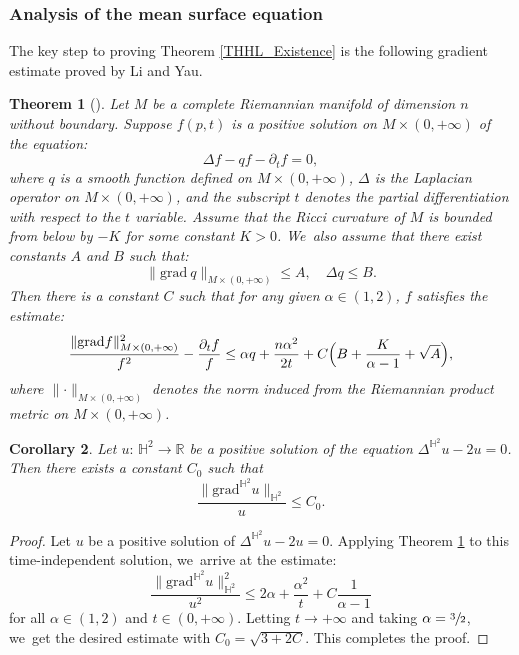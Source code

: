 \documentclass[JEP,XML,SOM,Unicode,NoEqCountersInSection, NoFloatCountersInSection,published]{cedram}
\theoremstyle{plain}
\newtheorem{cor}{Corollary}[section]
\newtheorem{theorem}[cor]{Theorem}
\theoremstyle{definition}
\newcommand{\grad}{\mathrm{grad}^{\mathbb{H}^2}}
\begin{document}
\subsubsection{Analysis of the mean surface equation}
The key step to proving Theorem \ref{THHL_Existence} is the following gradient estimate proved by Li and Yau.

\begin{theorem}[{\cite[Th.\,1.3]{Li_Yau}}]\label{Li_Yau}
Let $M$ be a complete Riemannian manifold of dimension $n$ without boundary. Suppose $f(p, t)$ is a positive solution on $M \times (0, +\infty)$ of the equation:
\[
\Delta f-qf-\partial_tf=0,
\]
where $q$ is a smooth function defined on $M \times (0, +\infty)$, $\Delta$ is the Laplacian operator on $M \times (0, +\infty)$, and the subscript $t$ denotes the partial differentiation with respect to the $t$ variable. Assume that the Ricci curvature of $M$ is bounded from below by $-K$ for some constant $K > 0$. We~also assume that there exist constants $A$ and $B$ such that:
\[
\lVert \mathrm{grad}\ q\rVert_{M\times(0,+\infty)}\leq A,\quad \Delta q\leq B.
\]
Then there is a constant $C$ such that for any given $\alpha \in (1, 2)$, $f$ satisfies the estimate:
\[
\frac{\lVert \mathrm{grad} f\rVert_{M\times(0,+\infty)}^2}{f^2}-\frac{\partial_tf}{f}\leq \alpha q+\frac{n\alpha^2}{2t}+C\Bigl(B+\frac{K}{\alpha-1}+\sqrt{A}\Bigr),
\]
where $\lVert\cdot\rVert_{M \times (0, +\infty)}$ denotes the norm induced from the Riemannian product metric on $M \times (0, +\infty)$.
\end{theorem}
\begin{cor}\label{Li_Yau_Cor}
Let $u{:}\, \mathbb{H}^2 \!\to\! \mathbb{R}$ be a positive solution of the equation \hbox{$\Delta^{\mathbb{H}^2} u \!-\! 2u \!=\! 0$}. Then there exists a constant $C_0$ such that
\[
\frac{\lVert \grad u\rVert_{\mathbb{H}^2}}{u} \leq C_0.
\]
\end{cor}

\begin{proof}
Let $u$ be a positive solution of $\Delta^{\mathbb{H}^2} u - 2u = 0$. Applying Theorem \ref{Li_Yau} to this time-independent solution, we~arrive at the estimate:
\[
\frac{\lVert \grad u\rVert_{\mathbb{H}^2}^2}{u^2} \leq 2\alpha + \frac{\alpha^2}{t} + C\frac{1}{\alpha-1}
\]
for all $\alpha \in (1,2)$ and $t \in (0, +\infty)$. Letting $t \to +\infty$ and taking $\alpha = \sfrac{3}{2}$, we~get the desired estimate with $C_0 = \sqrt{3 + 2C}$. This completes the proof.
\end{proof}
\end{document}
